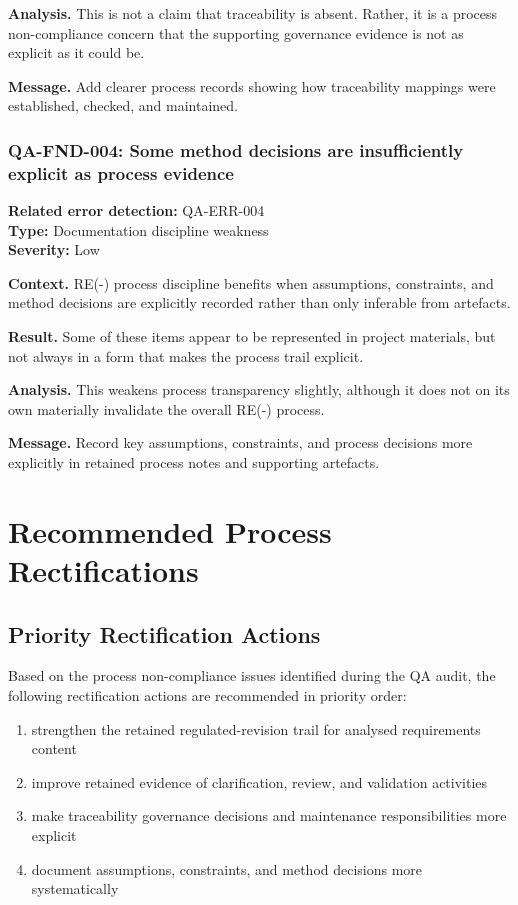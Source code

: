 \documentclass[11pt,a4paper]{article}
\begin{document}
\textbf{Analysis.} This is not a claim that traceability is absent. Rather, it is a process non-compliance concern that the supporting governance evidence is not as explicit as it could be.

\textbf{Message.} Add clearer process records showing how traceability mappings were established, checked, and maintained.

\subsubsection*{QA-FND-004: Some method decisions are insufficiently explicit as process evidence}
\textbf{Related error detection:} QA-ERR-004 \\
\textbf{Type:} Documentation discipline weakness \\
\textbf{Severity:} Low

\textbf{Context.} RE(-) process discipline benefits when assumptions, constraints, and method decisions are explicitly recorded rather than only inferable from artefacts.

\textbf{Result.} Some of these items appear to be represented in project materials, but not always in a form that makes the process trail explicit.

\textbf{Analysis.} This weakens process transparency slightly, although it does not on its own materially invalidate the overall RE(-) process.

\textbf{Message.} Record key assumptions, constraints, and process decisions more explicitly in retained process notes and supporting artefacts.


\section{Recommended Process Rectifications}

\subsection{Priority Rectification Actions}

Based on the process non-compliance issues identified during the QA audit, the following rectification actions are recommended in priority order:

\begin{enumerate}[leftmargin=*]
\item strengthen the retained regulated-revision trail for analysed requirements content
\item improve retained evidence of clarification, review, and validation activities
\item make traceability governance decisions and maintenance responsibilities more explicit
\item document assumptions, constraints, and method decisions more systematically
\end{enumerate}
\end{document}
